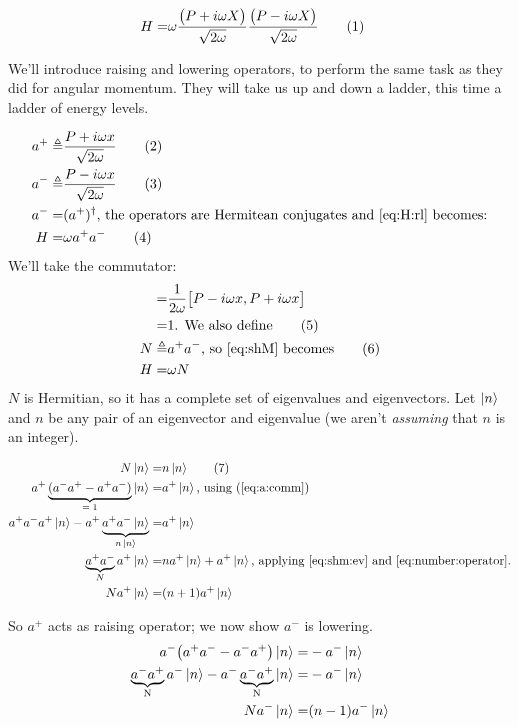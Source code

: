\documentclass[]{article}
\newcommand\numberthis{\addtocounter{equation}{1}\tag{\theequation}}
\begin{document}
\begin{align*}
	H =& \omega \frac{\big(P + i \omega X \big)}{\sqrt{2 \omega}}\frac{\big(P - i \omega X \big)}{\sqrt{2 \omega}} \numberthis \label{eq:H:rl}
\end{align*}

We'll introduce raising and lowering operators, to perform the same task as they did for angular momentum. They will take us up and down a ladder, this time a ladder of energy levels.

\begin{align*}
	a^+ \triangleq & \frac{P + i \omega x } {\sqrt{2 \omega}} \numberthis \label{eq:creation:operator}\\
	a^- \triangleq & \frac{P - i \omega x } {\sqrt{2 \omega}} \numberthis \label{eq:annihilation:operator}\\
	a^-=& (a^+)^\dagger \text{, the operators are Hermitean conjugates and \eqref{eq:H:rl} becomes:}\\
	H =& \omega a^+ a^-\numberthis \label{eq:shM}
\end{align*}
We'll take the commutator:
\begin{align*}
	[a^-,a^+] =& \frac{1}{2\omega}\big[P - i \omega x,P + i \omega x\big]\\
	=& 1\text{. We also define} \numberthis \label{eq:a:comm}\\
	N \triangleq& a^+a^-\text{, so \eqref{eq:shM} becomes} \numberthis \label{eq:number:operator}\\
	H =& \omega N
\end{align*}
$N$ is Hermitian, so it has a complete set of eigenvalues and eigenvectors. Let  $\ket{n}$  and $n$ be any pair of an eigenvector and eigenvalue (we aren't \emph{assuming} that $n$ is an integer).

\begin{align*}
	N\ket{n} =& n\ket{n} \numberthis \label{eq:shm:ev}\\
	a^+\underbrace{(a^-a^+ - a^+a^-)}_\text{$=1$}\ket{n} =& a^+\ket{n}\text{, using (\ref{eq:a:comm})}\\
	a^+a^-a^+ \ket{n} - a^+\underbrace{a^+a^- \ket{n}}_\text{$ n\ket{n}$} =& a^+\ket{n} \\ 
	\underbrace{a^+a^-}_\text{$N$}a^+ \ket{n} =& n a^+\ket{n} + a^+\ket{n} \text{, applying \eqref{eq:shm:ev} and \eqref{eq:number:operator}.}\\
	N a^+ \ket{n} =& (n+1) a^+ \ket{n}
\end{align*}

So $a^+$ acts as raising operator; we now show $a^-$ is lowering. 
\begin{align*}
	a^-\big(a^+a^- - a^-a^+\big) \ket{n} =& -a^-\ket{n}\\
	\underbrace{a^-a^+}_\text{N}a^-\ket{n} - a^- \underbrace{a^- a^+}_\text{N} \ket{n} =& -a^-\ket{n}\\
	N a^-\ket{n} =&	(n-1)a^-\ket{n}
\end{align*}
\end{document}
